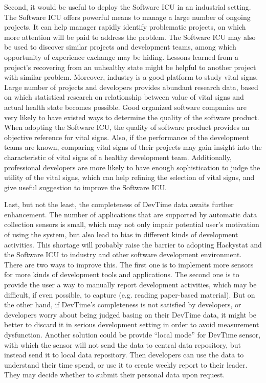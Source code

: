 Second, it would be useful to deploy the Software ICU in an industrial setting. The Software ICU offers powerful means to manage a large number of ongoing projects. It can help manager rapidly identify problematic projects, on which more attention will be paid to address the problem. The Software ICU may also be used to discover similar projects and development teams, among which opportunity of experience exchange may be hiding. Lessons learned from a project's recovering from an unhealthy state might be helpful to another project with similar problem. Moreover, industry is a good platform to study vital signs. Large number of projects and developers provides abundant research data, based on which statistical research on relationship between value of vital signs and actual health state becomes possible. Good organized software companies are very likely to have existed ways to determine the quality of the software product. When adopting the Software ICU, the quality of software product provides an objective reference for vital signs. Also, if the performance of the development teams are known, comparing vital signs of their projects may gain insight into the characteristic of vital signs of a healthy development team. Additionally, professional developers are more likely to have enough sophistication to judge the utility of the vital signs, which can help refining the selection of vital signs, and give useful suggestion to improve the Software ICU.
 
 
Last, but not the least, the completeness of DevTime data awaits further enhancement. The number of applications that are supported by automatic data collection sensors is small, which may not only impair potential user's motivation of using the system, but also lead to bias in different kinds of development activities. This shortage will probably raise the barrier to adopting Hackystat and the Software ICU to industry and other software development environment. There are two ways to improve this. The first one is to implement more sensors for more kinds of development tools and applications. The second one is to provide the user a way to manually report development activities, which may be difficult, if even possible, to capture (e.g. reading paper-based material). But on the other hand, if DevTime's completeness is not satisfied by developers, or developers worry about being judged basing on their DevTime data, it might be better to discard it in serious development setting in order to avoid measurement dysfunction. Another solution could be provide ``local mode'' for DevTime sensor, with which the sensor will not send the data to central data repository, but instead send it to local data repository. Then developers can use the data to understand their time spend, or use it to create weekly report to their leader. They may decide whether to submit their personal data upon request.


